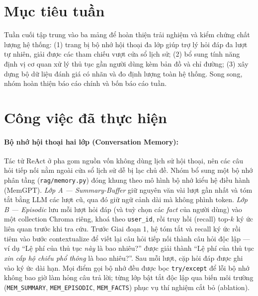 \documentclass[11pt]{article}
\begin{document}

\section{Mục tiêu tuần}
Tuần cuối tập trung vào ba mảng để hoàn thiện trải nghiệm và kiểm chứng chất lượng hệ thống:
(1) trang bị bộ nhớ hội thoại đa lớp giúp trợ lý hỏi đáp đa lượt tự nhiên, giải được các tham
chiếu vượt cửa sổ lịch sử; (2) bổ sung tính năng định vị cơ quan xử lý thủ tục gần người dùng
kèm bản đồ và chỉ đường; (3) xây dựng bộ dữ liệu đánh giá có nhãn và đo định lượng toàn hệ
thống. Song song, nhóm hoàn thiện báo cáo chính và bốn báo cáo tuần.

\section{Công việc đã thực hiện}

\paragraph{Bộ nhớ hội thoại hai lớp (Conversation Memory): }
Tác tử ReAct ở pha gom nguồn vốn không dùng lịch sử hội thoại, nên các câu hỏi tiếp nối nằm
ngoài cửa sổ lịch sử dễ bị lạc chủ đề. Nhóm bổ sung một bộ nhớ phân tầng (\texttt{rag/memory.py})
đóng khung theo mô hình bộ nhớ kiểu hệ điều hành (MemGPT). \emph{Lớp A — Summary-Buffer} giữ
nguyên văn vài lượt gần nhất và tóm tắt bằng LLM các lượt cũ, qua đó giữ ngữ cảnh dài mà không
phình token. \emph{Lớp B — Episodic} lưu mỗi lượt hỏi đáp (và tuỳ chọn các \emph{fact} của
người dùng) vào một collection Chroma riêng, khoá theo \texttt{user\_id}, rồi truy hồi (recall)
top-$k$ ký ức liên quan trước khi tra cứu. Trước Giai đoạn 1, hệ tóm tắt và recall ký ức rồi
tiêm vào bước contextualize để viết lại câu hỏi tiếp nối thành câu hỏi độc lập --- ví dụ
``Lệ phí của thủ tục \emph{này} là bao nhiêu?'' được giải thành ``Lệ phí của thủ tục
\emph{xin cấp hộ chiếu phổ thông} là bao nhiêu?''. Sau mỗi lượt, cặp hỏi đáp được ghi vào ký
ức dài hạn. Mọi điểm gọi bộ nhớ đều được bọc \texttt{try/except} để lỗi bộ nhớ không bao giờ
làm hỏng câu trả lời; từng lớp bật tắt độc lập qua biến môi trường (\texttt{MEM\_SUMMARY},
\texttt{MEM\_EPISODIC}, \texttt{MEM\_FACTS}) phục vụ thí nghiệm cắt bỏ (ablation).

\end{document}
